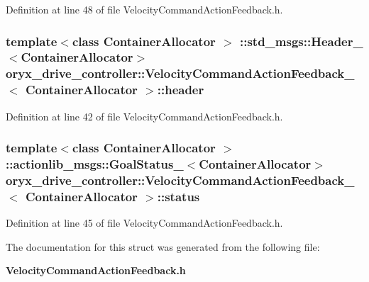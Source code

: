 \-Definition at line 48 of file \-Velocity\-Command\-Action\-Feedback.\-h.

\subsubsection[{header}]{\setlength{\rightskip}{0pt plus 5cm}template$<$class Container\-Allocator $>$ \-::std\-\_\-msgs\-::\-Header\-\_\-$<$\-Container\-Allocator$>$ {\bf oryx\-\_\-drive\-\_\-controller\-::\-Velocity\-Command\-Action\-Feedback\-\_\-}$<$ \-Container\-Allocator $>$\-::{\bf header}}\label{structoryx__drive__controller_1_1VelocityCommandActionFeedback___a03f465e2116cafa20ffeec2dbdd23215}


\-Definition at line 42 of file \-Velocity\-Command\-Action\-Feedback.\-h.

\subsubsection[{status}]{\setlength{\rightskip}{0pt plus 5cm}template$<$class Container\-Allocator $>$ \-::actionlib\-\_\-msgs\-::\-Goal\-Status\-\_\-$<$\-Container\-Allocator$>$ {\bf oryx\-\_\-drive\-\_\-controller\-::\-Velocity\-Command\-Action\-Feedback\-\_\-}$<$ \-Container\-Allocator $>$\-::{\bf status}}\label{structoryx__drive__controller_1_1VelocityCommandActionFeedback___a3bbed67477477d701aae6ce077a034c0}


\-Definition at line 45 of file \-Velocity\-Command\-Action\-Feedback.\-h.



\-The documentation for this struct was generated from the following file\-:\begin{DoxyCompactItemize}
\item 
{\bf \-Velocity\-Command\-Action\-Feedback.\-h}\end{DoxyCompactItemize}
